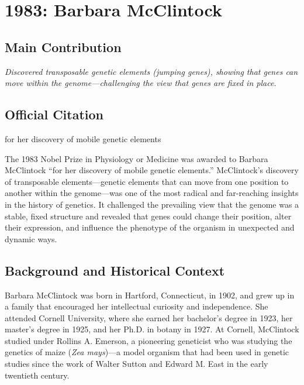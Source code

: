 \chapter[1983 --- McClintock]{1983: Barbara McClintock}
\label{ch:1983_barbaramcclintock}

\section*{Main Contribution}

\textit{Discovered transposable genetic elements (jumping genes), showing that genes can move within the genome---challenging the view that genes are fixed in place.}\cite{nobel-1983,lecture-1983}

\section{Official Citation}

for her discovery of mobile genetic elements

The 1983 Nobel Prize in Physiology or Medicine was awarded to Barbara McClintock ``for her discovery of mobile genetic elements.'' McClintock's discovery of transposable elements---genetic elements that can move from one position to another within the genome---was one of the most radical and far-reaching insights in the history of genetics. It challenged the prevailing view that the genome was a stable, fixed structure and revealed that genes could change their position, alter their expression, and influence the phenotype of the organism in unexpected and dynamic ways.

\section{Background and Historical Context}

Barbara McClintock was born in Hartford, Connecticut, in 1902, and grew up in a family that encouraged her intellectual curiosity and independence. She attended Cornell University, where she earned her bachelor's degree in 1923, her master's degree in 1925, and her Ph.D. in botany in 1927. At Cornell, McClintock studied under Rollins A. Emerson, a pioneering geneticist who was studying the genetics of maize (\emph{Zea mays})---a model organism that had been used in genetic studies since the work of Walter Sutton and Edward M. East in the early twentieth century.

